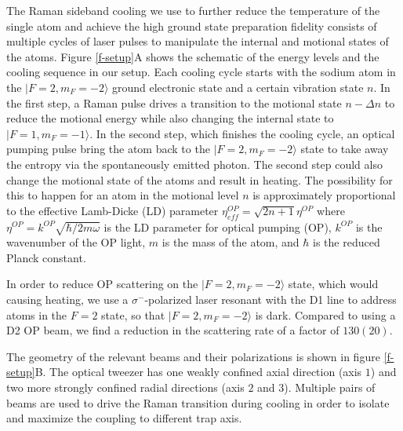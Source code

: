 \documentclass[aps,prl,twocolumn,groupedaddress]{revtex4-1}
\newcommand{\eff}{ef\! f}
\begin{document}
The Raman sideband cooling we use to further reduce the temperature of the single atom and
achieve the high ground state preparation fidelity consists of multiple cycles of laser pulses
to manipulate the internal and motional states of the atoms.
Figure \ref{f-setup}A shows the schematic of the energy levels and the cooling sequence
in our setup.
Each cooling cycle starts with the sodium atom in the $|F=2, m_F=-2\rangle$
ground electronic state and a certain vibration state $n$.
In the first step, a Raman pulse drives a transition to the motional state $n-\Delta n$
to reduce the motional energy while also changing the internal state to $|F=1, m_F=-1\rangle$.
In the second step, which finishes the cooling cycle,
an optical pumping pulse bring the atom back to the $|F=2, m_F=-2\rangle$ state to take away
the entropy via the spontaneously emitted photon.
The second step could also change the motional state of the atoms and result in heating.
The possibility for this to happen for an atom in the motional level $n$
is approximately proportional to the effective Lamb-Dicke (LD) parameter
$\eta^{OP}_{\eff}=\sqrt{2n+1}\eta^{OP}$ where $\eta^{OP}=k^{OP}\sqrt{\hbar/2m\omega}$
is the LD parameter for optical pumping (OP), $k^{OP}$ is the wavenumber of the OP light, $m$ is the mass of the atom, and $\hbar$ is the reduced Planck constant.

In order to reduce OP scattering on the $|F=2, m_F=-2\rangle$ state, which would causing heating, we use a $\sigma^-$-polarized laser resonant with the D1 line to address atoms in the $F=2$ state, so that $|F=2, m_F=-2\rangle$ is dark.  Compared to using a D2 OP beam, we find a reduction in the scattering rate of a factor of $130(20)$.

The geometry of the relevant beams and their polarizations is shown in figure \ref{f-setup}B.
The optical tweezer has one weakly confined axial direction (axis $1$) and
two more strongly confined radial directions (axis $2$ and $3$).
Multiple pairs of beams are used to drive the Raman transition during cooling in order to
isolate and maximize the coupling to different trap axis.
\end{document}
